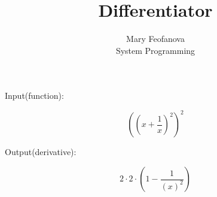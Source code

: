 \documentclass[12pt]{article}
\begin{document}
\title{Differentiator}
\author{Mary Feofanova\\
System Programming}
 
\maketitle
\begin{center}
Input(function):
\end{center}
$$((x+\frac{1}{x})^2 )^2 $$
\begin{center}
Output(derivative):
\end{center}
$$2 \cdot 2 \cdot (1-\frac{1}{(x)^2 })$$
\end{document}
